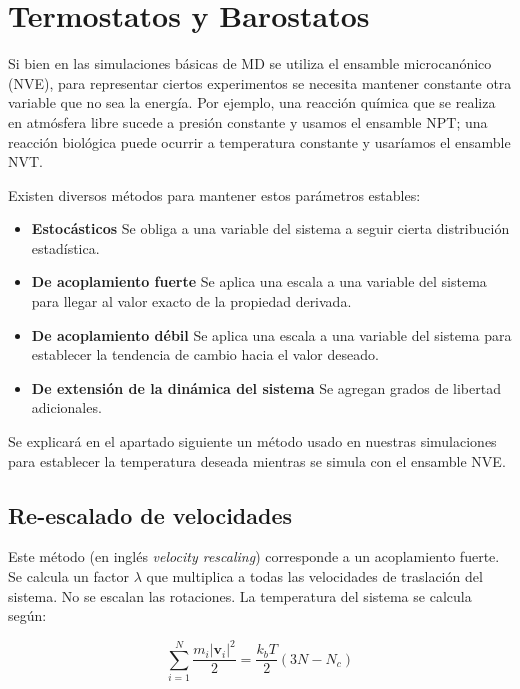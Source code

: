 \section{Termostatos y Barostatos}
\label{S2_5}

Si bien en las simulaciones básicas de MD se utiliza el ensamble microcanónico (NVE), para representar ciertos experimentos se necesita mantener constante otra variable que no sea la energía. Por ejemplo, una reacción química que se realiza en atmósfera libre sucede a presión constante y usamos el ensamble NPT; una reacción biológica puede ocurrir a temperatura constante y usaríamos el ensamble NVT.

Existen diversos métodos para mantener estos parámetros estables:

\begin{itemize}
	\item \textbf{Estocásticos} Se obliga a una variable del sistema a seguir cierta distribución estadística.
	\item \textbf{De acoplamiento fuerte} Se aplica una escala a una variable del sistema para llegar al valor exacto de la propiedad derivada.
	\item \textbf{De acoplamiento débil} Se aplica una escala a una variable del sistema para establecer la tendencia de cambio hacia el valor deseado.
	\item \textbf{De extensión de la dinámica del sistema} Se agregan grados de libertad adicionales.
\end{itemize}

Se explicará en el apartado siguiente un método usado en nuestras simulaciones para establecer la temperatura deseada mientras se simula con el ensamble NVE.

\subsection{Re-escalado de velocidades}
\label{S2_5_1}
Este método (en inglés \textit{velocity rescaling}) corresponde a un acoplamiento fuerte. Se calcula un factor $\lambda$ que multiplica a todas las velocidades de traslación del sistema. No se escalan las rotaciones. La temperatura del sistema se calcula según:

\begin{equation}
\sum_{i=1}^{N}\frac{m_{i}|\mathbf{v}_{i}|^{2}}{2} = \frac{k_{b}T}{2}(3N-N_{c})
\end{equation}

